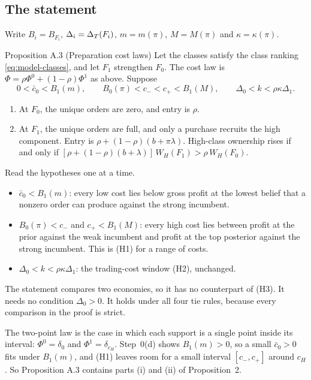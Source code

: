 \subsection{The statement}

Write \(B_i=B_{F_i}\), \(\Delta_i=\Delta_T(F_i)\), \(m=m(\pi)\), \(M=M(\pi)\) and \(\kappa=\kappa(\pi)\).

\begin{paperresult}{Proposition A.3 (Preparation cost laws)}
Let the classes satisfy the class ranking \eqref{eq:model-classes}, and let \(F_1\) strengthen \(F_0\). The cost law is \(\Phi=\rho\Phi^0+(1-\rho)\Phi^1\) as above. Suppose
\[
0<\bar c_0<B_1(m),\qquad B_0(\pi)<c_-<c_+<B_1(M),\qquad \Delta_0<k<\rho\kappa\Delta_1.
\]
\begin{enumerate}[label=(\roman*),leftmargin=2em]
\item At \(F_0\), the unique orders are zero, and entry is \(\rho\).
\item At \(F_1\), the unique orders are full, and only a purchase recruits the high component. Entry is \(\rho+(1-\rho)(b+\pi\lambda)\). High-class ownership rises if and only if \([\rho+(1-\rho)(b+\lambda)]\,W_H(F_1)>\rho\,W_H(F_0)\).
\end{enumerate}
\end{paperresult}

Read the hypotheses one at a time.
\begin{itemize}
\item \(\bar c_0<B_1(m)\): every low cost lies below gross profit at the lowest belief that a nonzero order can produce against the strong incumbent.
\item \(B_0(\pi)<c_-\) and \(c_+<B_1(M)\): every high cost lies between profit at the prior against the weak incumbent and profit at the top posterior against the strong incumbent. This is (H1) for a range of costs.
\item \(\Delta_0<k<\rho\kappa\Delta_1\): the trading-cost window (H2), unchanged.
\end{itemize}
The statement compares two economies, so it has no counterpart of (H3). It needs no condition \(\Delta_0>0\). It holds under all four tie rules, because every comparison in the proof is strict.

The two-point law is the case in which each support is a single point inside its interval: \(\Phi^0=\delta_0\) and \(\Phi^1=\delta_{c_H}\).
Step~0(d) shows \(B_1(m)>0\), so a small \(\bar c_0>0\) fits under \(B_1(m)\), and (H1) leaves room for a small interval \([c_-,c_+]\) around \(c_H\).
So Proposition A.3 contains parts (i) and (ii) of Proposition~2.

